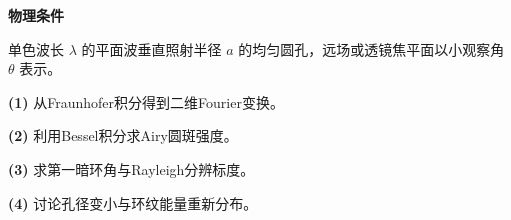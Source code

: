 \textbf{物理条件}\par 单色波长 \(\lambda\) 的平面波垂直照射半径 \(a\) 的均匀圆孔，远场或透镜焦平面以小观察角 \(\theta\) 表示。
\par\noindent\textbf{(1)} 从Fraunhofer积分得到二维Fourier变换。
\par\noindent\textbf{(2)} 利用Bessel积分求Airy圆斑强度。
\par\noindent\textbf{(3)} 求第一暗环角与Rayleigh分辨标度。
\par\noindent\textbf{(4)} 讨论孔径变小与环纹能量重新分布。
